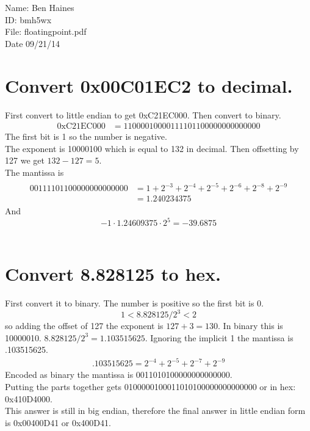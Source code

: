 \documentclass{article}
\begin{document}
Name: Ben Haines\\
ID: bmh5wx\\
File: floatingpoint.pdf\\
Date 09/21/14
\section{Convert 0x00C01EC2 to decimal.}
First convert to little endian to get 0xC21EC000. Then convert to binary.
\begin{align}
\text{0xC21EC000} &= 11000010000111101100000000000000
\end{align}
The first bit is 1 so the number is negative.\\
The exponent is 10000100 which is equal to 132 in decimal. Then offsetting by 127 we get $132-127=5$.\\
The mantissa is 
\begin{align}
\begin{split}
00111101100000000000000&=1 + 2^{-3} + 2^{-4} + 2^{-5} + 2^{-6} + 2^{-8} + 2^{-9}\\
&=1.240234375
\end{split}
\end{align}
And \\
$$-1 \cdot 1.24609375 \cdot 2^{5} = -39.6875$$
\\
\section{Convert 8.828125 to hex.}
First convert it to binary. The number is positive so the first bit is 0.
$$1< 8.828125/2^3 < 2$$
so adding the offset of 127 the exponent is $127+3=130$. In binary this is 10000010.
$8.828125/2^3 = 1.103515625$. Ignoring the implicit 1 the mantissa is .103515625.
\begin{align}
.103515625 = 2^{-4}+2^{-5}+2^{-7}+2^{-9}
\end{align}
Encoded as binary the mantissa is 0011010100000000000000.\\
Putting the parts together gets 0100000100011010100000000000000 or in hex: 0x410D4000.\\
This answer is still in big endian, therefore the final answer in little endian form is 0x00400D41 or 0x400D41.
\end{document}
